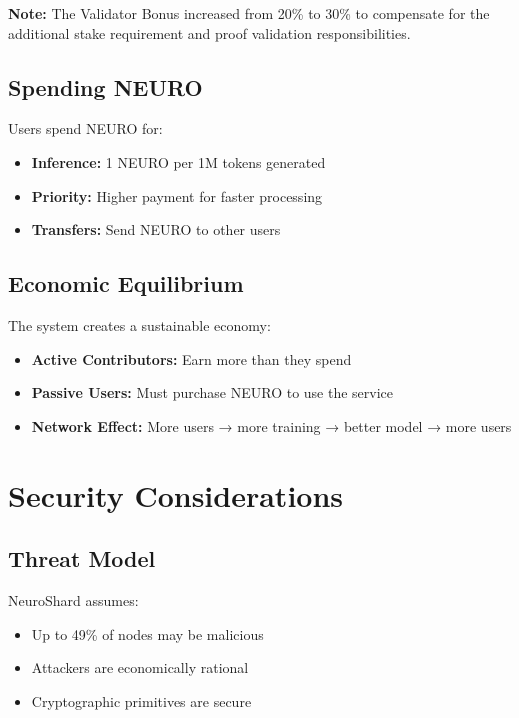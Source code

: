 \documentclass[11pt,a4paper]{article}
\begin{document}
\textbf{Note:} The Validator Bonus increased from 20\% to 30\% to compensate for the additional stake requirement and proof validation responsibilities.

\subsection{Spending NEURO}

Users spend NEURO for:

\begin{itemize}
    \item \textbf{Inference:} 1 NEURO per 1M tokens generated
    \item \textbf{Priority:} Higher payment for faster processing
    \item \textbf{Transfers:} Send NEURO to other users
\end{itemize}

\subsection{Economic Equilibrium}

The system creates a sustainable economy:

\begin{itemize}
    \item \textbf{Active Contributors:} Earn more than they spend
    \item \textbf{Passive Users:} Must purchase NEURO to use the service
    \item \textbf{Network Effect:} More users → more training → better model → more users
\end{itemize}

\section{Security Considerations}

\subsection{Threat Model}

NeuroShard assumes:
\begin{itemize}
    \item Up to 49\% of nodes may be malicious
    \item Attackers are economically rational
    \item Cryptographic primitives are secure
\end{itemize}
\end{document}

